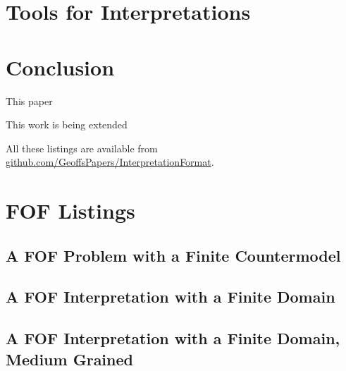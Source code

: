 \documentclass{easychair}
\begin{document}
\section{Tools for Interpretations}
\label{Tools}

\section{Conclusion}
\label{Conclusion}

This paper 

This work is being extended 



\newpage
\appendix

All these listings are available from
\href{https://github.com/GeoffsPapers/InterpretationFormat}{github.com/GeoffsPapers/InterpretationFormat}.

\section{FOF Listings}
\label{FOFListings}

\subsection{A FOF Problem with a Finite Countermodel}
\label{FOF_Finite.p}
\begin{small}

\end{small}

\newpage
\subsection{A FOF Interpretation with a Finite Domain}
\label{FOF_Finite.s}
\begin{small}

\end{small}

\newpage
\subsection{A FOF Interpretation with a Finite Domain, Medium Grained}
\label{FOF_Finite_Medium.s}
\begin{small}

\end{small}
\end{document}
